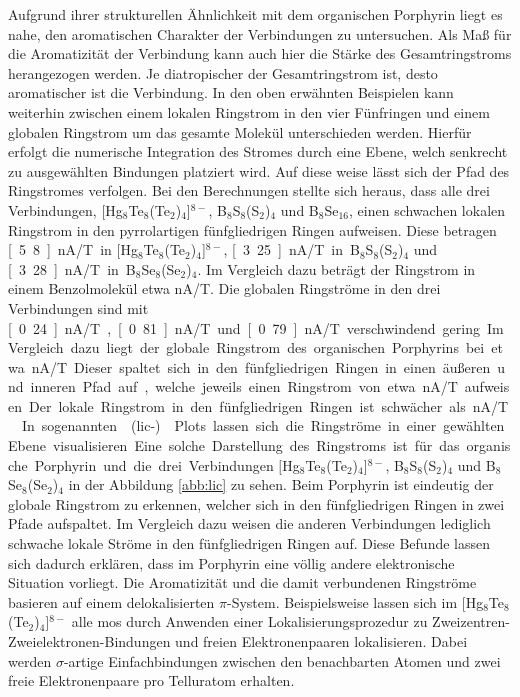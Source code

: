 Aufgrund ihrer strukturellen Ähnlichkeit mit dem organischen Porphyrin liegt es nahe, den aromatischen Charakter der Verbindungen zu untersuchen. Als Maß für die Aromatizität der Verbindung kann auch hier die Stärke des Gesamtringstroms herangezogen werden. Je diatropischer der Gesamtringstrom ist, desto aromatischer ist die Verbindung. In den oben erwähnten Beispielen kann weiterhin zwischen einem lokalen Ringstrom in den vier Fünfringen und einem globalen Ringstrom um das gesamte Molekül unterschieden werden. Hierfür erfolgt die numerische Integration des Stromes durch eine Ebene, welch senkrecht zu ausgewählten Bindungen platziert wird. Auf diese weise lässt sich der Pfad des Ringstromes verfolgen. Bei den Berechnungen stellte sich heraus, dass alle drei Verbindungen, $[$Hg$_8$Te$_8$(Te$_2$)$_4$]$^{8-}$, B$_8$S$_8$(S$_2$)$_4$ und B$_8$Se$_{16}$, einen schwachen lokalen Ringstrom in den pyrrolartigen fünfgliedrigen Ringen aufweisen. Diese betragen \unit[5.8]{nA/T} in $[$Hg$_8$Te$_8$(Te$_2$)$_4$]$^{8-}$, \unit[3.25]{nA/T} in B$_8$S$_8$(S$_2$)$_4$ und \unit[3.28]{nA/T} in B$_8$Se$_8$(Se$_2$)$_4$. Im Vergleich dazu beträgt der Ringstrom in einem Benzolmolekül etwa \unit[12]{nA/T}.\supercite{fliegl2012aromatic} Die globalen Ringströme in den drei Verbindungen sind mit \unit[0.24]{nA/T}, \unit[0.81]{nA/T} und \unit[0.79]{nA/T} verschwindend gering. Im Vergleich dazu liegt der globale Ringstrom des organischen Porphyrins bei etwa \unit[27]{nA/T}. Dieser spaltet sich in den fünfgliedrigen Ringen in einen äußeren und inneren Pfad auf, welche jeweils einen Ringstrom von etwa \unit[13]{nA/T} aufweisen. Der lokale Ringstrom in den fünfgliedrigen Ringen ist schwächer als \unit[1]{nA/T}.\supercite{fliegl2012aromatic} In sogenannten \mbox{(\acs{lic}-)}Plots lassen sich die Ringströme in einer gewählten Ebene visualisieren. Eine solche Darstellung des Ringstroms ist für das organische Porphyrin und die drei Verbindungen $[$Hg$_8$Te$_8$(Te$_2$)$_4$]$^{8-}$, B$_8$S$_8$(S$_2$)$_4$ und B$_8$Se$_8$(Se$_2$)$_4$ in der Abbildung \ref{abb:lic} zu sehen. Beim Porphyrin ist eindeutig der globale Ringstrom zu erkennen, welcher sich in den fünfgliedrigen Ringen in zwei Pfade aufspaltet. Im Vergleich dazu weisen die anderen Verbindungen lediglich schwache lokale Ströme in den fünfgliedrigen Ringen auf.
Diese Befunde lassen sich dadurch erklären, dass im Porphyrin eine völlig andere elektronische Situation vorliegt. Die Aromatizität und die damit verbundenen Ringströme basieren auf einem delokalisierten $\pi$-System. Beispielsweise lassen sich im $[$Hg$_8$Te$_8$(Te$_2$)$_4$]$^{8-}$ alle \acp{mo} durch Anwenden einer Lokalisierungsprozedur\supercite{boys1960sf} zu Zweizentren-Zweielektronen-Bindungen und freien Elektronenpaaren lokalisieren. Dabei werden $\sigma$-artige Einfachbindungen zwischen den benachbarten Atomen und zwei freie Elektronenpaare pro Telluratom erhalten. 


